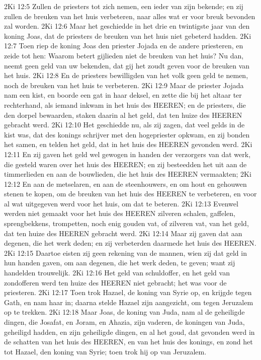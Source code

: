 2Ki 12:5  Zullen de priesters tot zich nemen, een ieder van zijn bekende; en zij zullen de breuken van het huis verbeteren, naar alles wat er voor breuk bevonden zal worden.
2Ki 12:6  Maar het geschiedde in het drie en twintigste jaar van den koning Joas, dat de priesters de breuken van het huis niet gebeterd hadden.
2Ki 12:7  Toen riep de koning Joas den priester Jojada en de andere priesteren, en zeide tot hen: Waarom betert gijlieden niet de breuken van het huis? Nu dan, neemt geen geld van uw bekenden, dat gij het zoudt geven voor de breuken van het huis.
2Ki 12:8  En de priesters bewilligden van het volk geen geld te nemen, noch de breuken van het huis te verbeteren.
2Ki 12:9  Maar de priester Jojada nam een kist, en boorde een gat in haar deksel, en zette die bij het altaar ter rechterhand, als iemand inkwam in het huis des HEEREN; en de priesters, die den dorpel bewaarden, staken daarin al het geld, dat ten huize des HEEREN gebracht werd.
2Ki 12:10  Het geschiedde nu, als zij zagen, dat veel gelds in de kist was, dat des konings schrijver met den hogepriester opkwam, en zij bonden het samen, en telden het geld, dat in het huis des HEEREN gevonden werd.
2Ki 12:11  En zij gaven het geld wel gewogen in handen der verzorgers van dat werk, die gesteld waren over het huis des HEEREN; en zij besteedden het uit aan de timmerlieden en aan de bouwlieden, die het huis des HEEREN vermaakten;
2Ki 12:12  En aan de metselaren, en aan de steenhouwers, en om hout en gehouwen stenen te kopen, om de breuken van het huis des HEEREN te verbeteren, en voor al wat uitgegeven werd voor het huis, om dat te beteren.
2Ki 12:13  Evenwel werden niet gemaakt voor het huis des HEEREN zilveren schalen, gaffelen, sprengbekkens, trompetten, noch enig gouden vat, of zilveren vat, van het geld, dat ten huize des HEEREN gebracht werd.
2Ki 12:14  Maar zij gaven dat aan degenen, die het werk deden; en zij verbeterden daarmede het huis des HEEREN.
2Ki 12:15  Daartoe eisten zij geen rekening van de mannen, wien zij dat geld in hun handen gaven, om aan degenen, die het werk deden, te geven; want zij handelden trouwelijk.
2Ki 12:16  Het geld van schuldoffer, en het geld van zondofferen werd ten huize des HEEREN niet gebracht; het was voor de priesteren.
2Ki 12:17  Toen trok Hazael, de koning van Syrie op, en krijgde tegen Gath, en nam haar in; daarna stelde Hazael zijn aangezicht, om tegen Jeruzalem op te trekken.
2Ki 12:18  Maar Joas, de koning van Juda, nam al de geheiligde dingen, die Josafat, en Joram, en Ahazia, zijn vaderen, de koningen van Juda, geheiligd hadden, en zijn geheiligde dingen, en al het goud, dat gevonden werd in de schatten van het huis des HEEREN, en van het huis des konings, en zond het tot Hazael, den koning van Syrie; toen trok hij op van Jeruzalem.

